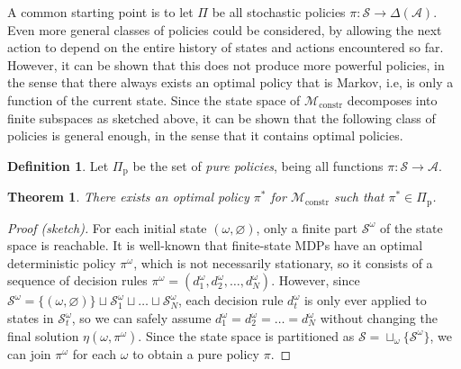 \documentclass{report}
\theoremstyle{definition}
\newtheorem{define}{Definition}[chapter]
\theoremstyle{plain}
\newtheorem{theorem}{Theorem}[chapter]
\begin{document}

A common starting point is to let $\Pi$ be all stochastic policies
$\pi : \mathcal{S} \rightarrow \Delta(\mathcal{A})$.
%
Even more general classes of policies could be considered, by allowing the next
action to depend on the entire history of states and actions encountered so far.
However, it can be shown that this does not produce more powerful policies, in
the sense that there always exists an optimal policy that is Markov, i.e, is
only a function of the current state.
%
Since the state space of $\mathcal{M}_\mathrm{constr}$ decomposes into finite
subspaces as sketched above, it can be shown that the following class of
policies is general enough, in the sense that it contains optimal policies.

\begin{define}
  Let $\Pi_\mathrm{p}$ be the set of \emph{pure policies}, being all functions
  $\pi : \mathcal{S} \rightarrow \mathcal{A}$.
\end{define}

\begin{theorem}
  There exists an optimal policy $\pi^*$ for $\mathcal{M}_\mathrm{constr}$ such
  that $\pi^* \in \Pi_\mathrm{p}$.
\end{theorem}
\begin{proof}[Proof (sketch)]
  For each initial state $(\omega, \varnothing)$, only a finite part
  $\mathcal{S}^\omega$ of the state space is reachable.
  It is well-known that finite-state MDPs have an optimal deterministic policy
  $\pi^\omega$, which is not necessarily stationary, so it consists of a
  sequence of decision rules
  $\pi^\omega = (d^\omega_1, d^\omega_2, \dots, d^\omega_N)$.
  However, since
  $\mathcal{S}^\omega = \{(\omega, \varnothing)\} \sqcup \mathcal{S}_1^\omega \sqcup \dots \sqcup \mathcal{S}_N^\omega$,
  each decision rule $d_t^\omega$ is only ever applied to states in
  $\mathcal{S}_t^\omega$, so we can safely assume
  $d_1^\omega = d_2^\omega = \dots = d_N^\omega$ without changing the final
  solution $\eta(\omega, \pi^\omega)$.
  Since the state space is partitioned as
  $\mathcal{S} = \sqcup_\omega \{ \mathcal{S}^\omega \}$, we can join
  $\pi^\omega$ for each $\omega$ to obtain a pure policy $\pi$.
\end{proof}
\end{document}
